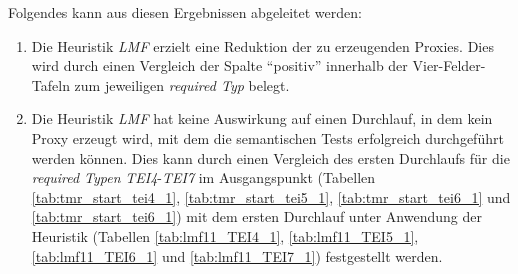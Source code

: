 \begin{multicols}{2}
\end{multicols}

\begin{multicols}{2}
\end{multicols}
\noindent
Folgendes kann aus diesen Ergebnissen abgeleitet werden:
\begin{enumerate}
\item Die Heuristik \emph{LMF} erzielt eine Reduktion der zu erzeugenden Proxies. Dies wird durch einen Vergleich der Spalte ``positiv'' innerhalb der Vier-Felder-Tafeln zum jeweiligen \emph{required Typ} belegt.

\item Die Heuristik \emph{LMF} hat keine Auswirkung auf einen Durchlauf, in dem kein Proxy erzeugt wird, mit dem die semantischen Tests erfolgreich durchgeführt werden können. Dies kann durch einen Vergleich des ersten Durchlaufs für die \emph{required Typen} \emph{TEI4}-\emph{TEI7} im Ausgangspunkt (Tabellen \ref{tab:tmr_start_tei4_1}, \ref{tab:tmr_start_tei5_1}, \ref{tab:tmr_start_tei6_1} und \ref{tab:tmr_start_tei6_1}) mit dem ersten Durchlauf unter Anwendung der Heuristik (Tabellen \ref{tab:lmf11_TEI4_1}, \ref{tab:lmf11_TEI5_1}, \ref{tab:lmf11_TEI6_1} und \ref{tab:lmf11_TEI7_1}) festgestellt werden.
\end{enumerate}



